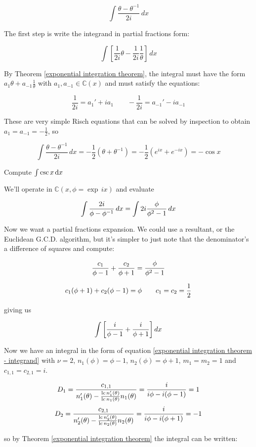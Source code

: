 $$\int \frac{\theta - \theta^{-1}}{2i} \,dx$$

The first step is write the integrand in partial fractions form:

$$\int \left[ \frac{1}{2i} \theta - \frac{1}{2i} \frac{1}{\theta} \right] \,dx $$

By Theorem \ref{exponential integration theorem}, the integral must have the
form $a_1 \theta + a_{-1} \frac{1}{\theta}$ with $a_1, a_{-1} \in {\mathbb
C}(x)$ and must satisfy the equations:

$$\frac{1}{2i} = a_1' + i a_1 \qquad - \frac{1}{2i} = a_{-1}' - i a_{-1}$$ 

These are very simple Risch equations that can be solved by inspection
to obtain $a_1 = a_{-1} = -\frac{1}{2}$, so

$$\int \frac{\theta - \theta^{-1}}{2i} \,dx = -\frac{1}{2}(\theta + \theta^{-1})
 = -\frac{1}{2}(e^{ix} + e^{-ix}) = -\cos x$$

\endexample

\vfill\eject

\example Compute $\int \csc x \, {\rm d}x$

We'll operate in ${\mathbb C}(x, \phi = \exp \,ix)$ and evaluate

$$\int {{2i}\over{\phi - \phi^{-1}}} \,dx = \int 2i {{\phi}\over{\phi^2 - 1}} \,dx$$

Now we want a partial fractions expansion.  We could use a resultant,
or the Euclidean G.C.D. algorithm, but it's simpler to just note that
the denominator's a difference of squares and compute:

$${{c_1}\over{\phi-1}} + {{c_2}\over{\phi+1}} = {{\phi}\over{\phi^2-1}} $$

$${{c_1}(\phi+1)} + {{c_2}(\phi-1)} = \phi \qquad c_1 = c_2 = {1\over2} $$

giving us

$$\int \left[ {{i}\over{\phi-1}} + {{i}\over{\phi+1}} \right] dx$$

Now we have an integral in the form of equation
\eqref{exponential integration theorem - integrand}
with $\nu=2$, $n_1(\phi) = \phi -1$,
$n_2(\phi) = \phi + 1$,
$m_1=m_2=1$ and $c_{1,1} = c_{2,1} = i$.

$$D_{1} = \frac{c_{1,1}}{n_1'(\theta) - \frac{{\rm lc\,} n_1'(\theta)}{{\rm lc\,} n_1(\theta)} n_1(\theta)} = \frac{i}{i \phi - i (\phi-1)} = 1$$
$$D_{2} = \frac{c_{2,1}}{n_2'(\theta) - \frac{{\rm lc\,} n_2'(\theta)}{{\rm lc\,} n_2(\theta)} n_2(\theta)} = \frac{i}{i \phi - i (\phi+1)} = -1$$

so by Theorem \ref{exponential integration theorem}
the integral can be written:

